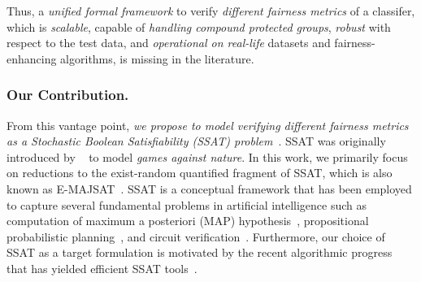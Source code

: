Thus, a \textit{unified formal framework} to verify \textit{different fairness metrics} of a classifer, which is \textit{scalable}, capable of \textit{handling compound protected groups}, \textit{robust} with respect to the test data, and \textit{operational on real-life} datasets and fairness-enhancing algorithms, is missing in the literature.

\subsubsection{Our Contribution.} From this vantage point, \textit{we propose to model verifying different fairness metrics as a Stochastic Boolean Satisfiability (SSAT) problem}~\cite{littman2001stochastic}. SSAT was originally introduced by ~\cite{papadimitriou1985games} to model {\em games against nature}. In this work, we primarily focus on reductions to the exist-random quantified fragment of SSAT, which is also known as E-MAJSAT~\cite{littman2001stochastic}.   SSAT is a conceptual framework that has been employed to capture several fundamental problems in artificial intelligence such as computation of maximum a posteriori (MAP) hypothesis~\cite{fremont2017maximum},  propositional probabilistic planning~\cite{majercik2007appssat},  and circuit verification~\cite{lee2018towards}. Furthermore, our choice of SSAT as a target formulation is motivated by the recent algorithmic progress that has yielded efficient SSAT tools~\cite{lee2017solving,lee2018solving}.




